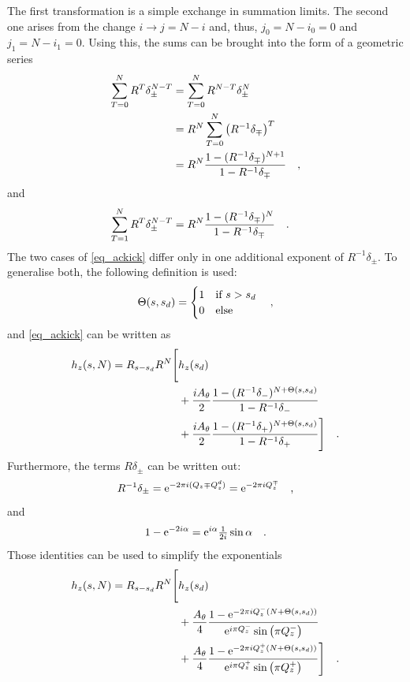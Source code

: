 %
The first transformation is a simple exchange in summation limits. The second one arises from the
change $i\rightarrow j=N-i$ and, thus, $j_0 = N-i_0 = 0$ and $j_1 = N - i_1 = 0$.
Using this, the sums can be brought into the form of a geometric series
%
\begin{align}
    \sum\limits_{T=0}^N R^T\delta_\pm^{N-T}
    &= \sum\limits_{T=0}^N R^{N-T}\delta_\pm^{N} \notag \\
    &=  R ^N \sum\limits_{T=0}^N \left( R^{-1}\delta_\mp \right)^{T} \notag \\
    &=  R ^N \frac{1- (R^{-1}\delta_\mp)^{N+1}}{1 - R^{-1}\delta_\mp}
    \quad ,
\end{align}
%
and
%
\begin{align}
    \sum\limits_{T=1}^N R^T\delta_\pm^{N-T}
    &= R^N \frac{1- (R^{-1}\delta_\mp)^{N}}{1 - R^{-1}\delta_\mp}
    \quad .
\end{align}
%
The two cases of \eqref{eq_ackick} differ only in one additional exponent of $R^{-1}\delta_\pm$.
To generalise both, the following definition is used:
%
\begin{equation}
    \Theta(s,s_d) =
    \begin{cases}
        1 & \text{if } s > s_d \\
        0 & \text{else} \\
    \end{cases}
    \quad ,
\end{equation}
%
and \eqref{eq_ackick} can be written as
%
\begin{align}
    h_z(s, N) = R_{s-s_d}R^N 
    \Bigg[&h_z(s_d)  \notag \\
        &+ \frac{iA_\theta}{2}\frac{1-(R^{-1}\delta_-)^{N+\Theta(s,s_d)}}{1-R^{-1}\delta_-} \notag \\
        &+ \frac{iA_\theta}{2}\frac{1-(R^{-1}\delta_+)^{N+\Theta(s,s_d)}}{1-R^{-1}\delta_+} 
    \Bigg]
    \quad .
\end{align}
%
Furthermore, the terms $R\delta_\pm$ can be written out:
%
\begin{equation}
    R^{-1}\delta_\pm = \text{e}^{-2\pi i (Q_z \mp Q^{d}_{z})} = \text{e}^{-2\pi i Q_z^\mp}
    \quad ,
\end{equation}
%
and
%
\begin{equation}
    1 - \text{e}^{-2i\alpha} = \text{e}^{i\alpha}\tfrac{1}{2i} \sin\alpha
    \quad .
\end{equation}
%
Those identities can be used to simplify the exponentials
%
\begin{align}
    h_z(s, N) = R_{s-s_d}R^N 
    \Bigg[&h_z(s_d)  \notag \\
        &+ \frac{A_\theta}{4}\frac{1-\text{e}^{-2\pi i Q_z^-(N+\Theta(s,s_d))}}{\text{e}^{i\pi Q_z^-}\sin\left( \pi Q_z^- \right)} \notag \\
        &+ \frac{A_\theta}{4}\frac{1-\text{e}^{-2\pi i Q_z^+(N+\Theta(s,s_d))}}{\text{e}^{i\pi Q_z^+}\sin\left( \pi Q_z^+ \right)} 
    \Bigg]
    \quad .
    \label{eq_delta_written_out}
\end{align}
